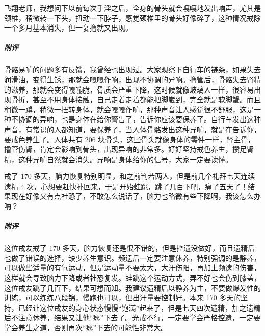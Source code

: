 \begin{case}
    飞翔老师，我想问下以前每次手淫之后，全身的骨头就会嘎嘎地发出响声，尤其是颈椎，稍微转一下头，扭动一下脖子，感觉颈椎里的骨头好像碎了，这种情况戒除一个多月基本消失，但一复撸就又出现。
    \subparagraph{附评} 骨骼易响的问题多有反馈，我曾经也出现过。大家观察下自行车的链条，如果失去润滑油，变得生锈，那就会嘎嘎作响，出现不协调的异响。撸管后，骨骼失去肾精的滋养，那就会变得嘎嘣脆，骨质会严重下降，这时候就像玻璃人一样，很容易出现骨折，甚至不用身体接触，自己走着走着都能把脚崴到，完全就是软脚蟹。而且稍微一蹲，稍微一扭转身体，就会嘎嘎作响，那种声音让人感觉很不舒服，这是一种不协调的异响，也是身体在给你警告了，告诉你应该要保养了。自行车发出这种声音，有常识的人都知道，要保养了，当人体骨骼发出这种异响，就是在告诉你，要戒色养生了。人体共有 206 块骨头，这些骨头就像身体的零件一样，肾主骨，撸管伤肾，肯定会影响到骨头，出现异响的非常多。好好坚持戒色养生，攒足肾精，这种异响自然就会消失。异响是身体给你的信号，大家一定要读懂。
\end{case}

\begin{case}
    戒了 170 多天，脑力恢复特别明显，和之前判若两人，但是前几个礼拜七天连续遗精 4 次，心想要赶快补回来，于是开始蛙跳，跳了几百下吧，痛了五天了！结果现在好像又有点社恐了，不敢怎么说话了，脑力也略微有些下降啊，我该怎么办呐？
    \subparagraph{附评} 这位戒友戒了 170 多天，脑力恢复还是很不错的，但是控遗没做好，而且遗精后也做了错误的选择，缺少养生意识。频遗后一定要注意休养，特别强调的是静养，可以做些适量的有氧运动，但是运动量不要太大，大汗伤阳，再加上频遗的伤害，这样就会导致脑力下降或者社恐复发。蛙跳这个运动方式，弄不好也会伤到膝盖，这位戒友跳了几百下，结果可想而知。我建议遗精后以静养为主，不要做爆发性的训练，可以练练八段锦，慢跑也可以，但出汗量要控制好。本来 170 多天的坚持，已经让这位戒友的身心状态慢慢“饱满”起来了，但是七天四次遗精，加之遗精后不注意休养，结果又让他“瘪”下去了。光戒不行，一定要学会严格控遗，一定要学会养生之道，否则再次“瘪”下去的可能性非常大。
\end{case}

